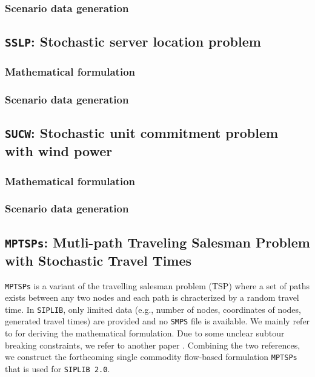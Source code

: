 \subsubsection{Scenario data generation}


\subsection{\texttt{SSLP}: Stochastic server location problem}

\subsubsection{Mathematical formulation}

\subsubsection{Scenario data generation}


\subsection{\texttt{SUCW}: Stochastic unit commitment problem with wind power}

\subsubsection{Mathematical formulation}

\subsubsection{Scenario data generation}



\subsection{\texttt{MPTSPs}: Mutli-path Traveling Salesman Problem with Stochastic Travel Times}
\texttt{MPTSPs} is a variant of the travelling salesman problem (TSP) where a set of paths exists between any two nodes and each path is chracterized by a random travel time. In \texttt{SIPLIB}, only limited data (e.g., number of nodes, coordinates of nodes, generated travel times) are provided and no \texttt{SMPS} file is available. We mainly refer to \cite{journal:PGM2017} for deriving the mathematical formulation. Due to some unclear subtour breaking constraints, we refer to another paper \cite{journal:LSD1990}. Combining the two references, we construct the forthcoming single commodity flow-based formulation \texttt{MPTSPs} that is used for \texttt{SIPLIB 2.0}. 
